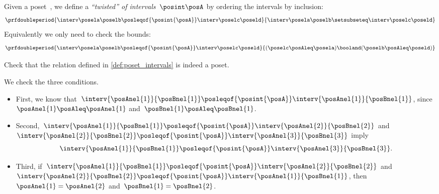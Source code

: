 \begin{marginfigure}
    \centering
    \caption{
        $\interv \posela \poselb
            \posleqof{\posint{\posA}}
            \interv \poselc \poseld$
    }
\end{marginfigure}

\begin{definition}
    \label{def:poset_intervals}
    Given a poset~\posA, we define a \emph{``twisted''  of intervals}~$\posint\posA$
    by ordering the intervals by inclusion:
    \begin{equation}\label{eq:twisted-1}
        \prfdoubleperiod{
            \interv \posela \poselb
            \posleqof{\posint{\posA}}
            \interv \poselc \poseld
        }{
            \interv \posela \poselb
            \setsubseteq
            \interv \poselc \poseld
        }
    \end{equation}
    Equivalently we only need to check the bounds:
    \begin{equation}\label{eq:twisted-2}
        \prfdoubleperiod{
            \interv \posela \poselb
            \posleqof{\posint{\posA}}
            \interv \poselc \poseld
        }{
            (\poselc \posAleq \posela ) \booland (\poselb \posAleq \poseld)
        }
    \end{equation}

\end{definition}

\begin{exercise}
    Check that the relation defined in \cref{def:poset_intervals} is indeed a poset.
\end{exercise}
\begin{solution}
    We check the three conditions.
    \begin{itemize}
        \item First, we know that~$\interv{\posAnel{1}}{\posBnel{1}}\posleqof{\posint{\posA}}\interv{\posAnel{1}}{\posBnel{1}}$, since~$\posAnel{1}\posAleq \posAnel{1}$ and~$\posBnel{1}\posAleq \posBnel{1}$.
        \item Second,~$\interv{\posAnel{1}}{\posBnel{1}}\posleqof{\posint{\posA}}\interv{\posAnel{2}}{\posBnel{2}}$ and~$\interv{\posAnel{2}}{\posBnel{2}}\posleqof{\posint{\posA}}\interv{\posAnel{3}}{\posBnel{3}}$ imply
              \begin{equation}
                  \interv{\posAnel{1}}{\posBnel{1}}\posleqof{\posint{\posA}}\interv{\posAnel{3}}{\posBnel{3}}.
              \end{equation}
        \item Third, if~$\interv{\posAnel{1}}{\posBnel{1}}\posleqof{\posint{\posA}}\interv{\posAnel{2}}{\posBnel{2}}$ and~$\interv{\posAnel{2}}{\posBnel{2}}\posleqof{\posint{\posA}}\interv{\posAnel{1}}{\posBnel{1}}$, then~$\posAnel{1}=\posAnel{2}$ and~$\posBnel{1}=\posBnel{2}$.
    \end{itemize}
\end{solution}

